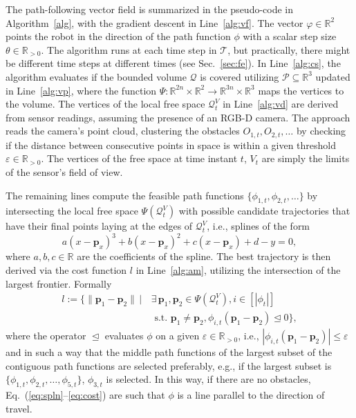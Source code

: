 \documentclass[letterpaper,10pt,conference,twoside]{IEEEtran}
\theoremstyle{definition}
\begin{document}
The path-following vector field is summarized in the pseudo-code in Algorithm~\ref{alg}, with the gradient descent in Line~\ref{alg:vf}. The vector $\varphi\in\mathbb{R}^2$ points the robot in the direction of the path function $\phi$ with a scalar step size $\theta\in\mathbb{R}_{>0}$. The algorithm runs at each time step in $\mathcal{T}$, %
but practically, there might be different time steps at different times (see Sec.~\ref{sec:fe}). 
In Line~\ref{alg:cs}, the algorithm evaluates if the bounded volume $\mathcal{Q}$ is covered utilizing $\mathcal{P}\subseteq\mathbb{R}^3$ updated in Line~\ref{alg:vp}, where the function $\Psi:\mathbb{R}^{2n}\times\mathbb{R}^2\rightarrow\mathbb{R}^{3n}\times\mathbb{R}^3$ maps the vertices to the volume. The vertices of the local free space $\mathcal{Q}^V_t$ in Line~\ref{alg:vd} are derived from sensor readings, assuming the presence of an RGB-D camera. The %
approach reads the camera's point cloud, clustering the obstacles $O_{1,t},O_{2,t},\dots$ by checking if the distance between consecutive points in space is within a given threshold $\varepsilon\in\mathbb{R}_{>0}$. The vertices of the free space at time instant $t$, $V_t$ are simply the limits of the sensor's field of view.

The remaining lines %
compute the feasible path functions $\{\phi_{1,t},\phi_{2,t},\dots\}$ by intersecting the local free space $\Psi(\mathcal{Q}^V_t)$ with possible candidate trajectories that have their final points laying at the edges of $\mathcal{Q}^V_t$, i.e., splines of the form
\begin{equation}\label{eq:spln}
  a(x-\mathbf{p}_x)^3+b(x-\mathbf{p}_x)^2+c(x-\mathbf{p}_x)+d-y=0,
\end{equation}
where $a,b,c\in\mathbb{R}$ are the coefficients of the spline. 
The best trajectory is then derived via the cost function $l$ in Line~\ref{alg:am}, utilizing the intersection of the largest frontier. Formally
\begin{equation}\label{eq:cost}\begin{split} 
  l:=\bigl\{\lVert \mathbf{p}_1-\mathbf{p}_2\rVert\,|\,&\exists\,\mathbf{p}_1,\mathbf{p}_2\in\Psi(\mathcal{Q}_t^V),i\in[|\phi_t|]\\
  &\text{ s.t. }\mathbf{p}_1\neq\mathbf{p}_2,\phi_{i,t}(\mathbf{p}_1-\mathbf{p}_2)\trianglelefteq 0\bigr\},
\end{split}\end{equation}
where the operator $\trianglelefteq$ evaluates $\phi$ on a given $\varepsilon\in\mathbb{R}_{>0}$, i.e., $|\phi_{i,t}(\mathbf{p}_1-\mathbf{p}_2)|\leq\varepsilon$ and in such a way that the middle path functions of the largest subset of the contiguous path functions are selected preferably, e.g., if the largest subset is $\{\phi_{1,t},\phi_{2,t},\dots,\phi_{5,t}\}$, $\phi_{3,t}$ is selected.
In this way, if there are no obstacles, Eq.~(\ref{eq:spln}--\ref{eq:cost}) are such that $\phi$ is a line parallel to the direction of travel. 
\end{document}
